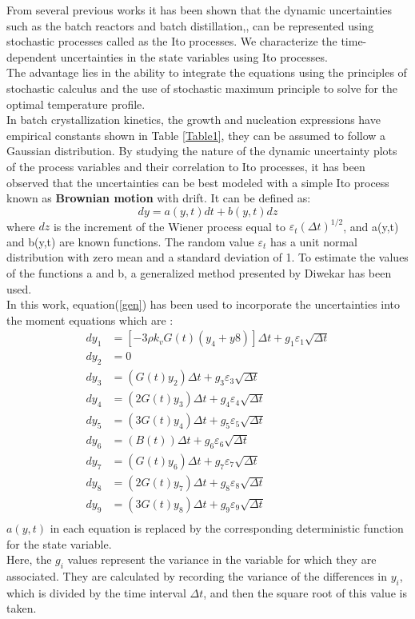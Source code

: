 From several previous works it has been shown that the dynamic uncertainties
such as the batch reactors\cite{benavides2} and batch distillation,\cite{diwekar}, can be represented using stochastic processes called as the Ito processes.  We characterize the time-dependent uncertainties in the state variables using Ito processes.\\
The advantage lies in the ability to integrate the equations using the principles of stochastic calculus and the use of stochastic maximum principle to solve for the optimal temperature profile. \\
In batch crystallization kinetics, the growth and nucleation expressions have empirical constants shown in Table \ref{Table1}, they can be assumed to follow a Gaussian distribution\cite{yenkie}. By studying the nature of the dynamic uncertainty plots of the process variables and their correlation to Ito processes, it has been observed that the uncertainties can be best modeled with a simple Ito process known as \textbf{Brownian motion} with drift\cite{diwekar,wong}. It can be defined as:
\begin{equation} \label{gen}
dy = a(y,t)dt + b(y,t)dz
\end{equation}
where $dz$ is the increment of the Wiener process equal to $\varepsilon_{t}(\Delta t)^{1/2}$, and a(y,t) and b(y,t) are known functions. The random value $\varepsilon_{t}$  has a unit normal distribution with zero mean
and a standard deviation of 1. To estimate the values of the functions a and b, a generalized method presented by Diwekar\cite{diwekar} has been used.\\
In this work, equation(\ref{gen}) has been used to incorporate the uncertainties into the moment equations which are\cite{yenkie} :
\begin{align}
dy_{1} &= \left[-3\rho k_{v}G(t)(y_{4}+y{8})\right]\Delta t + g_{1}\varepsilon_{1}\sqrt{\Delta t} \\
dy_{2} &= 0 \\
dy_{3} &= (G(t)y_{2})\Delta t +g_{3}\varepsilon_{3}\sqrt{\Delta t} \\
dy_{4} &= (2G(t)y_{3})\Delta t + g_{4}\varepsilon_{4}\sqrt{\Delta t} \\
dy_{5} &= (3G(t)y_{4})\Delta t + g_{5}\varepsilon_{5}\sqrt{\Delta t} \\
dy_{6} &= (B(t))\Delta t + g_{6}\varepsilon_{6}\sqrt{\Delta t} \\
dy_{7} &= (G(t)y_{6})\Delta t + g_{7}\varepsilon_{7}\sqrt{\Delta t} \\
dy_{8} &= (2G(t)y_{7})\Delta t +g_{8}\varepsilon_{8}\sqrt{\Delta t} \\
dy_{9} &= (3G(t)y_{8})\Delta t + g_{9}\varepsilon_{9}\sqrt{\Delta t} \\
\end{align}
$a(y,t)$ in each equation is replaced by the corresponding deterministic function   for the state variable.\\
Here, the $g_{i}$ values represent the variance in the variable for which they are associated. They are calculated by recording the variance of the differences in $y_{i}$, which is divided by the time
interval $\Delta t$, and then the square root of this value is taken.


